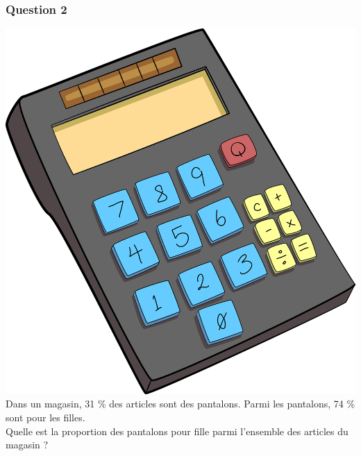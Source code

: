 \documentclass[15pt, mathserif]{beamer}
\begin{document}
\begin{frame} 
	\frametitle{Question 2}
 \includegraphics[scale=0.01]{calculatrice} Dans un magasin, 31 \% des articles sont des pantalons. Parmi les pantalons, 74 \% sont pour les filles. \\ Quelle est la proportion des pantalons pour fille parmi l'ensemble des articles du magasin ?\end{frame}
\end{document}
